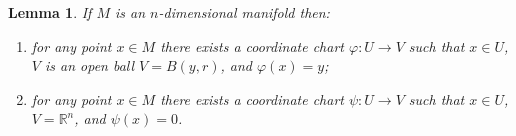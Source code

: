 \documentclass[11pt, letterpaper, oneside]{report}
\theoremstyle{pplain}
\newtheorem{lemma}[theorem]{Lemma}
\newtheorem{ITERMVALUE THM}[theorem]{Intermediate Value Theorem}
\newtheorem{HEINEBOREL THM}[theorem]{Heine-Borel Theorem}
\newtheorem{UMETR THM}[theorem]{Urysohn Metrization Theorem}
\newtheorem{UMETR2 THM}[theorem]{Urysohn Metrization Theorem (v.2)}
\theoremstyle{ddefinition}
\theoremstyle{nnn}
\newtheorem{TDA NN}[theorem]{Topological Data Analysis. }
\theoremstyle{eexercise}
\newcommand{\R}{{\mathbb R}}
\newcommand{\benu}{\begin{enumerate}}
\newcommand{\eenu}{\end{enumerate}}
\begin{document}


\begin{lemma}
\label{COORD LEMMA}
If $M$ is an $n$-dimensional manifold then:
\benu
\item for any point $x\in M$ there exists a coordinate chart $\varphi\colon U \to V$ such that $x\in U$, 
$V$ is an open ball $V= B(y, r)$, and $\varphi(x) = y$;
\item for any point $x\in M$ there exists a coordinate chart $\psi\colon U \to V$ such that $x\in U$,  
$V = \R^{n}$, and $\psi(x) = 0$.
\eenu
\end{lemma}
\end{document}

